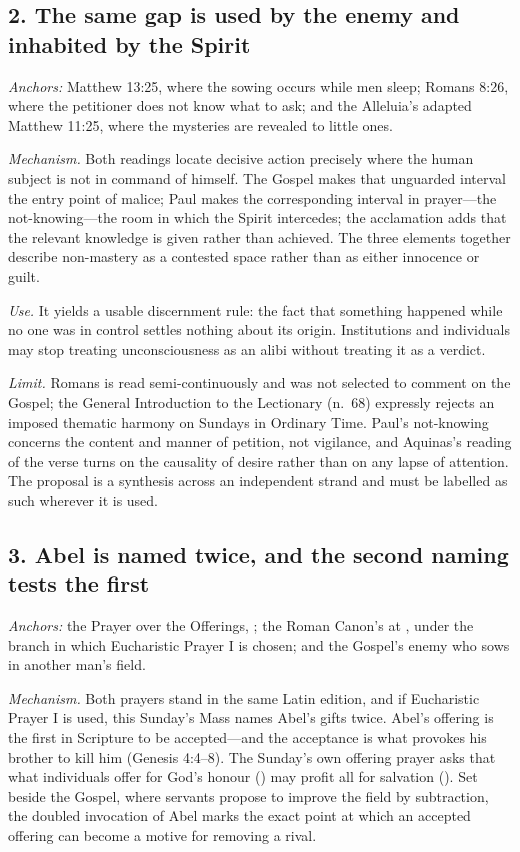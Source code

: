 \subsection*{2. The same gap is used by the enemy and inhabited by the Spirit}

\emph{Anchors:} Matthew 13:25, where the sowing occurs while men sleep; Romans
8:26, where the petitioner does not know what to ask; and the Alleluia's
adapted Matthew 11:25, where the mysteries are revealed to little ones.

\emph{Mechanism.} Both readings locate decisive action precisely where the
human subject is not in command of himself. The Gospel makes that unguarded
interval the entry point of malice; Paul makes the corresponding interval in
prayer---the not-knowing---the room in which the Spirit intercedes; the
acclamation adds that the relevant knowledge is given rather than achieved. The
three elements together describe non-mastery as a contested space rather than
as either innocence or guilt.

\emph{Use.} It yields a usable discernment rule: the fact that something
happened while no one was in control settles nothing about its origin.
Institutions and individuals may stop treating unconsciousness as an alibi
without treating it as a verdict.

\emph{Limit.} Romans is read semi-continuously and was not selected to comment
on the Gospel; the General Introduction to the Lectionary (n.\ 68) expressly
rejects an imposed thematic harmony on Sundays in Ordinary Time. Paul's
not-knowing concerns the content and manner of petition, not vigilance, and
Aquinas's reading of the verse turns on the causality of desire rather than on
any lapse of attention. The proposal is a synthesis across an independent
strand and must be labelled as such wherever it is used.

\subsection*{3. Abel is named twice, and the second naming tests the first}

\emph{Anchors:} the Prayer over the Offerings, ; the
Roman Canon's  at ,
under the branch in which Eucharistic Prayer I is chosen; and the Gospel's
enemy who sows in another man's field.

\emph{Mechanism.} Both prayers stand in the same Latin edition, and if
Eucharistic Prayer I is used, this Sunday's Mass names Abel's gifts twice.
Abel's offering is the first in Scripture to be accepted---and the acceptance
is what provokes his brother to kill him (Genesis 4:4--8). The Sunday's own
offering prayer asks that what individuals offer for God's honour
() may profit all for salvation (). Set
beside the Gospel, where servants propose to improve the field by subtraction,
the doubled invocation of Abel marks the exact point at which an accepted
offering can become a motive for removing a rival.

